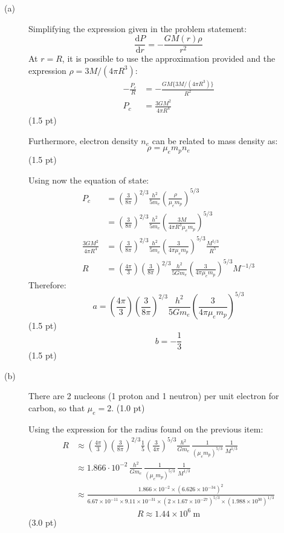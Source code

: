 \begin{description}
\item[(a)] Simplifying the expression given in the problem statement:
  \[ \frac{\mathrm{d}P}{\mathrm{d}r} = -\frac{GM(r)\rho}{r^2} \]
  At $r = R$, it is possible to use the approximation provided and the
  expression $\rho = 3M/(4\pi R^3)$:
  \begin{align*}
    -\frac{P_c}{R} &= -\frac{GM\{3M/(4\pi R^3)\}}{R^2}\\
    P_c &= \frac{3GM^2}{4\pi R^4}
  \end{align*}
  \hfill(1.5 pt)

  Furthermore, electron density $n_e$ can be related to mass density as:
  \[ \rho = \mu_e m_p n_e \]
  \hfill(1.5 pt)

  Using now the equation of state:
  \begin{align*}
    P_c &= \left(\frac{3}{8\pi}\right)^{2/3}\frac{h^2}{5m_e}
      \left(\frac{\rho}{\mu_e m_p}\right)^{5/3}\\
    &= \left(\frac{3}{8\pi}\right)^{2/3}\frac{h^2}{5m_e}
      \left(\frac{3M}{4\pi R^3\mu_e m_p}\right)^{5/3}\\
    \frac{3GM^2}{4\pi R^4}
    &= \left(\frac{3}{8\pi}\right)^{2/3}\frac{h^2}{5m_e}
      \left(\frac{3}{4\pi\mu_e m_p}\right)^{5/3}\frac{M^{5/3}}{R^5}\\
    R &= \left(\frac{4\pi}{3}\right)\left(\frac{3}{8\pi}\right)^{2/3}
      \frac{h^2}{5Gm_e}\left(\frac{3}{4\pi\mu_e m_p}\right)^{5/3} M^{-1/3}
  \end{align*}
  Therefore:
  \[ \boxed{a = \left(\frac{4\pi}{3}\right)
     \left(\frac{3}{8\pi}\right)^{2/3}\frac{h^2}{5Gm_e}
     \left(\frac{3}{4\pi\mu_e m_p}\right)^{5/3}} \]
  \hfill(1.5 pt)
  \[ \boxed{b = -\frac{1}{3}} \]
  \hfill(1.5 pt)
\item[(b)] There are 2 nucleons (1 proton and 1 neutron) per unit electron
  for carbon, so that $\mu_e = 2$. \hfill(1.0 pt)

  Using the expression for the radius found on the previous item:
  \begin{align*}
    R &\approx \left(\frac{4\pi}{3}\right)
      \left(\frac{3}{8\pi}\right)^{2/3}\frac{1}{5}
      \left(\frac{3}{4\pi}\right)^{5/3}\frac{h^2}{Gm_e}\,
      \frac{1}{(\mu_e m_p)^{5/3}}\,\frac{1}{M^{1/3}}\\
    &\approx 1.866\cdot10^{-2}\,\frac{h^2}{Gm_e}\,
      \frac{1}{(\mu_e m_p)^{5/3}}\,\frac{1}{M^{1/3}}\\
    &\approx \frac{1.866\times10^{-2}\times
      \left(6.626\times10^{-34}\right)^2}
      {6.67\times10^{-11}\times 9.11\times10^{-31}\times
      \left(2\times1.67\times10^{-27}\right)^{5/3}\times
      \left(1.988\times10^{30}\right)^{1/3}}
  \end{align*}
  \[ \boxed{R \approx 1.44\times10^{6}\ \mathrm{m}} \]
  \hfill(3.0 pt)
\end{description}

